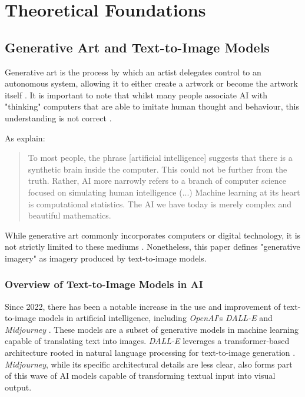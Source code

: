 \section{Theoretical Foundations}

\subsection{Generative Art and Text-to-Image Models}
\label{subsec:generative-art}

Generative art is the process by which an artist delegates control to an autonomous system, allowing it to either create a artwork or become the artwork itself \parencite[112]{Galanter2019}. It is important to note that whilst many people associate AI with "thinking" computers that are able to imitate human thought and behaviour, this understanding is not correct \parencite{Thomas2023}.

As \textcite[673 - 677]{Broussard2019} explain:
\begin{quote}
To most people, the phrase [artificial intelligence] suggests that there is a synthetic brain inside the computer. This could not be further from the truth. Rather, AI more narrowly refers to a branch of computer science focused on simulating human intelligence (...) Machine learning at its heart is computational statistics. The AI we have today is merely complex and beautiful mathematics.
\end{quote}
While generative art commonly incorporates computers or digital technology, it is not strictly limited to these mediums \parencite[5]{Thomas2023}. Nonetheless, this paper defines "generative imagery" as imagery produced by text-to-image models. 

\subsubsection{Overview of Text-to-Image Models in AI}

Since 2022, there has been a notable increase in the use and improvement of text-to-image models in artificial intelligence, including \textit{OpenAI}'s \textit{DALL-E} and \textit{Midjourney}  \parencite{Gozalo2023}. These models are a subset of generative models in machine learning \parencite{Bie2023} capable of translating text into images. \textit{DALL-E} leverages a transformer-based architecture rooted in natural language processing for text-to-image generation \parencite{DataCamp2023}. \textit{Midjourney}, while its specific architectural details are less clear, also forms part of this wave of AI models capable of transforming textual input into visual output.

